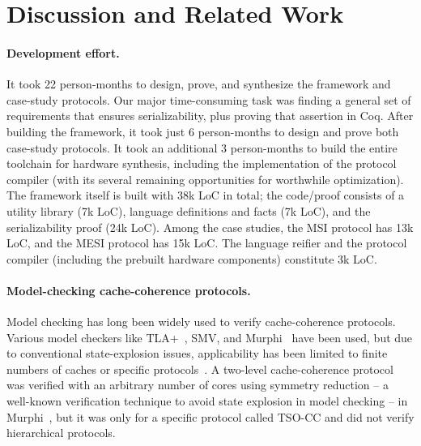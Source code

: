 \documentclass[sigplan,10pt,review,anonymous,screen]{acmart}\settopmatter{printfolios=true,printccs=false,printacmref=false}
\begin{document}
\section{Discussion and Related Work}
\label{sec-discussion}

\paragraph{Development effort.}
It took 22 person-months to design, prove, and synthesize the framework and case-study protocols.
Our major time-consuming task was finding a general set of requirements that ensures serializability, plus proving that assertion in Coq.
After building the framework, it took just 6 person-months to design and prove both case-study protocols.
It took an additional 3 person-months to build the entire toolchain for hardware synthesis, including the implementation of the protocol compiler (with its several remaining opportunities for worthwhile optimization).
The framework itself is built with 38k LoC in total; the code/proof consists of a utility library (7k LoC), language definitions and facts (7k LoC), and the serializability proof (24k LoC).
Among the case studies, the MSI protocol has 13k LoC, and the MESI protocol has 15k LoC.
The \hemiola{} language reifier and the protocol compiler (including the prebuilt hardware components) constitute 3k LoC.

\paragraph{Model-checking cache-coherence protocols.}


Model checking has long been widely used to verify cache-coherence protocols.
Various model checkers like TLA+~\cite{tla:Lamport:2002}, SMV, and Murphi~\cite{murphi:Dill:1996} have been used, but due to conventional state-explosion issues, applicability has been limited to finite numbers of caches or specific protocols~\cite{Joshi:2003,Komuravelli:2014}.
A two-level cache-coherence protocol was verified with an arbitrary number of cores using symmetry reduction -- a well-known verification technique to avoid state explosion in model checking -- in Murphi~\cite{Banks:2017}, but it was only for a specific protocol called TSO-CC and did not verify hierarchical protocols.
\end{document}
